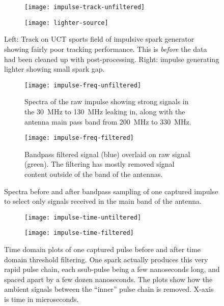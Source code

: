 \begin{figure}
  \centering
  \begin{subfigure}[b]{0.82\textwidth}
    \centering
    \texttt{[image: impulse-track-unfiltered]}
  \end{subfigure}
  \begin{subfigure}[b]{0.17\textwidth}
    \centering
    \texttt{[image: lighter-source]}
  \end{subfigure}
  \caption{Left: Track on UCT sports field of impulsive spark generator showing fairly poor tracking performance. This is \emph{before} the data had been cleaned up with post-processing. Right: impulse generating lighter showing small spark gap.}
  \label{fig:field-trials:impulse-source}
\end{figure}

\begin{figure}
  \centering
  \begin{subfigure}[b]{0.8\textwidth}
    \centering
    \texttt{[image: impulse-freq-unfiltered]}
    \caption{Spectra of the raw impulse showing strong signals in the \SI{30}{\mega\hertz} to \SI{130}{\mega\hertz} leaking in, along with the antenna main pass band from \SI{200}{\mega\hertz} to \SI{330}{\mega\hertz}.}
  \end{subfigure}
  \begin{subfigure}[b]{0.8\textwidth}
    \centering
    \texttt{[image: impulse-freq-filtered]}
    \caption{Bandpass filtered signal (blue) overlaid on raw signal (green). The filtering has mostly removed signal content outside of the band of the antennas.}
  \end{subfigure}
  \caption{Spectra before and after bandpass sampling of one captured impulse to select only signals received in the main band of the antenna.}
  \label{fig:field-trials:impulse-source-freq-filtering}
\end{figure}

\begin{figure}
  \centering
  \begin{subfigure}[b]{0.8\textwidth}
    \centering
    \texttt{[image: impulse-time-untiltered]}
  \end{subfigure}
  \begin{subfigure}[b]{0.8\textwidth}
    \centering
    \texttt{[image: impulse-time-filtered]}
  \end{subfigure}
  \caption{Time domain plots of one captured pulse before and after time domain threshold filtering. One spark actually produces this very rapid pulse chain, each ssub-pulse being a few nanoseconds long, and spaced apart by a few dozen nanoseconds. The plots show how the ambient signals between the ``inner'' pulse chain is removed. X-axis is time in microseconds.}
  \label{fig:field-trials:impulse-source-time-filtering}
\end{figure}

